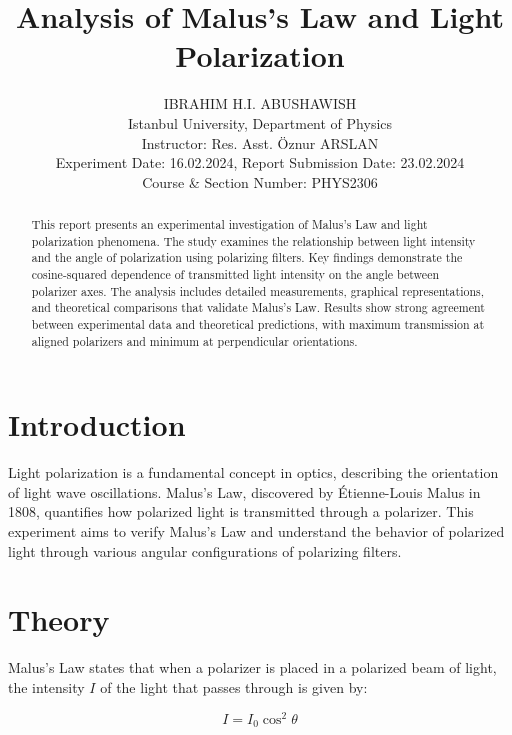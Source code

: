 \documentclass[journal]{IEEEtran}
\begin{document}
 
\title{Analysis of Malus's Law and Light Polarization}
\author{IBRAHIM H.I. ABUSHAWISH \\
Istanbul University, Department of Physics \\
Instructor: Res. Asst. Öznur ARSLAN \\
Experiment Date: 16.02.2024, Report Submission Date: 23.02.2024\\
Course \& Section Number: PHYS2306}

\maketitle

\begin{abstract}
    This report presents an experimental investigation of Malus's Law and light polarization phenomena. The study examines the relationship between light intensity and the angle of polarization using polarizing filters. Key findings demonstrate the cosine-squared dependence of transmitted light intensity on the angle between polarizer axes. The analysis includes detailed measurements, graphical representations, and theoretical comparisons that validate Malus's Law. Results show strong agreement between experimental data and theoretical predictions, with maximum transmission at aligned polarizers and minimum at perpendicular orientations.
\end{abstract}
    
\section{Introduction}
Light polarization is a fundamental concept in optics, describing the orientation of light wave oscillations. Malus's Law, discovered by Étienne-Louis Malus in 1808, quantifies how polarized light is transmitted through a polarizer. This experiment aims to verify Malus's Law and understand the behavior of polarized light through various angular configurations of polarizing filters.

\section{Theory}
Malus's Law states that when a polarizer is placed in a polarized beam of light, the intensity $I$ of the light that passes through is given by:

\begin{equation}
    I = I_0\cos^2\theta
\end{equation}
\end{document}
